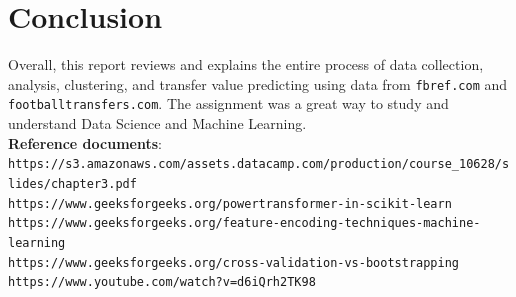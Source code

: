 \documentclass{report}
\begin{document}
\section{Conclusion}
Overall, this report reviews and explains the entire process of data collection, analysis, clustering, and 
transfer value predicting using data from \verb|fbref.com| and \verb|footballtransfers.com|. 
The assignment was a great way to study and understand Data Science and Machine Learning. \\

\textbf{Reference documents}: \\
{\small \verb|https://s3.amazonaws.com/assets.datacamp.com/production/course_10628/slides/chapter3.pdf|} \\
{\small \verb|https://www.geeksforgeeks.org/powertransformer-in-scikit-learn|} \\ 
{\small \verb|https://www.geeksforgeeks.org/feature-encoding-techniques-machine-learning|} \\
{\small \verb|https://www.geeksforgeeks.org/cross-validation-vs-bootstrapping|} \\
{\small \verb|https://www.youtube.com/watch?v=d6iQrh2TK98|} \\

\end{document}
